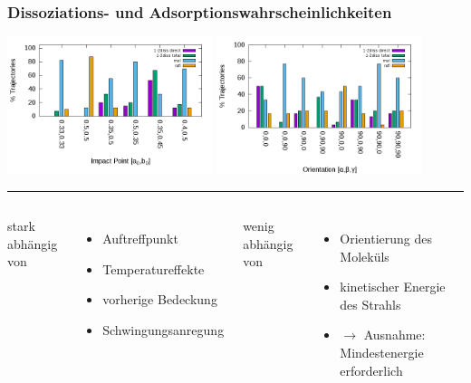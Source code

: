 \documentclass[hyperref={pdfpagelabels=false}]{beamer}
\begin{document}
\begin{frame}
 \frametitle{Dissoziations- und Adsorptionswahrscheinlichkeiten}
 \includegraphics[width=0.45\textwidth]{figures/impactpoint.png}
\includegraphics[width=0.45\textwidth]{figures/orientation.png}\hrule\pause
 \begin{columns}
  stark abhängig von
  \begin{itemize}
   \item Auftreffpunkt
   \item Temperatureffekte
   \item vorherige Bedeckung
   \item Schwingungsanregung
  \end{itemize}
  \newline wenig abhängig von
  \begin{itemize}
   \item Orientierung des Moleküls
   \item kinetischer Energie des Strahls 
   \item $\rightarrow$ Ausnahme: Mindestenergie erforderlich
  \end{itemize}
 \end{columns}
\\ 
\end{frame}
\end{document}
